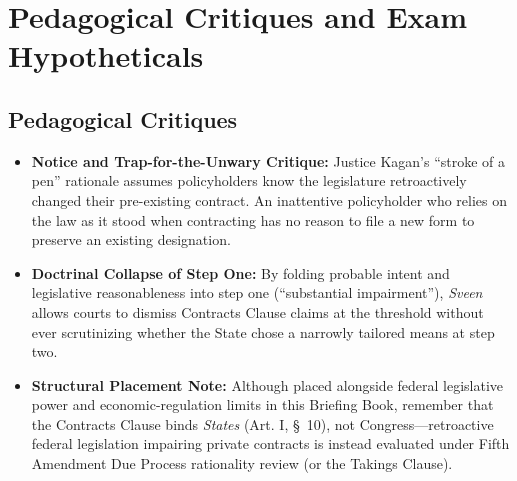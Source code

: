 \documentclass[12pt]{article}
\begin{document}
\section{Pedagogical Critiques and Exam Hypotheticals}
\subsection{Pedagogical Critiques}
\begin{itemize}
  \item \textbf{Notice and Trap-for-the-Unwary Critique:} Justice Kagan's ``stroke of a pen'' rationale assumes policyholders know the legislature retroactively changed their pre-existing contract. An inattentive policyholder who relies on the law as it stood when contracting has no reason to file a new form to preserve an existing designation.
  \item \textbf{Doctrinal Collapse of Step One:} By folding probable intent and legislative reasonableness into step one (``substantial impairment''), \textit{Sveen} allows courts to dismiss Contracts Clause claims at the threshold without ever scrutinizing whether the State chose a narrowly tailored means at step two.
  \item \textbf{Structural Placement Note:} Although placed alongside federal legislative power and economic-regulation limits in this Briefing Book, remember that the Contracts Clause binds \textit{States} (Art. I, \S~10), not Congress---retroactive federal legislation impairing private contracts is instead evaluated under Fifth Amendment Due Process rationality review (or the Takings Clause).
\end{itemize}
\end{document}
